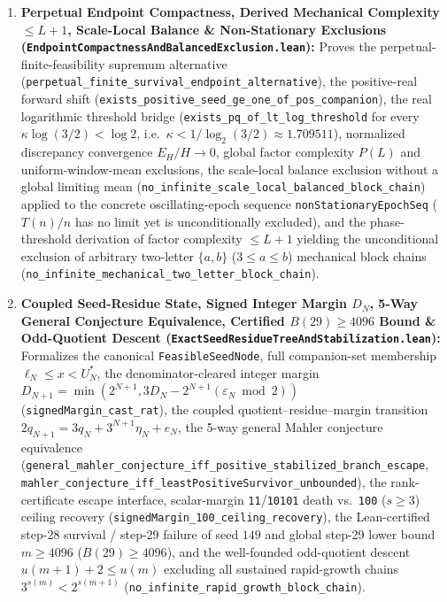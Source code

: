\documentclass[11pt]{article}
\begin{document}
\begin{enumerate}
  \item \textbf{Perpetual Endpoint Compactness, Derived Mechanical Complexity $\le L+1$, Scale-Local Balance \& Non-Stationary Exclusions (\texttt{EndpointCompactnessAndBalancedExclusion.lean}):} Proves the perpetual-finite-feasibility supremum alternative (\texttt{perpetual\_finite\_survival\_endpoint\_alternative}), the positive-real forward shift (\texttt{exists\_positive\_seed\_ge\_one\_of\_pos\_companion}), the real logarithmic threshold bridge (\texttt{exists\_pq\_of\_lt\_log\_threshold} for every $\kappa \log(3/2) < \log 2$, i.e.\ $\kappa < 1/\log_2(3/2) \approx 1.709511$), normalized discrepancy convergence $E_H / H \to 0$, global factor complexity $P(L)$ and uniform-window-mean exclusions, the scale-local balance exclusion without a global limiting mean (\texttt{no\_infinite\_scale\_local\_balanced\_block\_chain}) applied to the concrete oscillating-epoch sequence \texttt{nonStationaryEpochSeq} ($T(n)/n$ has no limit yet is unconditionally excluded), and the phase-threshold derivation of factor complexity $\le L+1$ yielding the unconditional exclusion of arbitrary two-letter $\{a,b\}$ ($3 \le a \le b$) mechanical block chains (\texttt{no\_infinite\_mechanical\_two\_letter\_block\_chain}).
  \item \textbf{Coupled Seed-Residue State, Signed Integer Margin $D_N$, 5-Way General Conjecture Equivalence, Certified $B(29) \ge 4096$ Bound \& Odd-Quotient Descent (\texttt{ExactSeedResidueTreeAndStabilization.lean}):} Formalizes the canonical \texttt{FeasibleSeedNode}, full companion-set membership $\ell_N \le x < U_N^*$, the denominator-cleared integer margin $D_{N+1} = \min(2^{N+1}, 3D_N - 2^{N+1}(\varepsilon_N \bmod 2))$ (\texttt{signedMargin\_cast\_rat}), the coupled quotient--residue--margin transition $2q_{N+1} = 3q_N + 3^{N+1}\eta_N + e_N$, the 5-way general Mahler conjecture equivalence (\texttt{general\_mahler\_conjecture\_iff\_positive\_stabilized\_branch\_escape}, \texttt{mahler\_conjecture\_iff\_leastPositiveSurvivor\_unbounded}), the rank-certificate escape interface, scalar-margin \texttt{11}/\texttt{10101} death vs.\ \texttt{100} ($s \ge 3$) ceiling recovery (\texttt{signedMargin\_100\_ceiling\_recovery}), the Lean-certified step-28 survival / step-29 failure of seed $149$ and global step-29 lower bound $m \ge 4096$ ($B(29) \ge 4096$), and the well-founded odd-quotient descent $u(m+1) + 2 \le u(m)$ excluding all sustained rapid-growth chains $3^{s(m)} < 2^{s(m+1)}$ (\texttt{no\_infinite\_rapid\_growth\_block\_chain}).

\end{enumerate}
\end{document}

